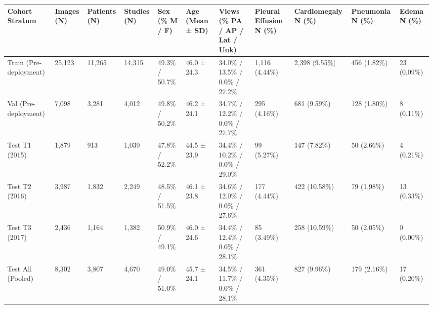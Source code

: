 \begin{tabular}{lllllllllll}
\toprule
Cohort Stratum & Images (N) & Patients (N) & Studies (N) & Sex (\% M / F) & Age (Mean ± SD) & Views (\% PA / AP / Lat / Unk) & Pleural Effusion N (\%) & Cardiomegaly N (\%) & Pneumonia N (\%) & Edema N (\%) \\
\midrule
Train (Pre-deployment) & 25,123 & 11,265 & 14,315 & 49.3\% / 50.7\% & 46.0 ± 24.3 & 34.0\% / 13.5\% / 0.0\% / 27.2\% & 1,116 (4.44\%) & 2,398 (9.55\%) & 456 (1.82\%) & 23 (0.09\%) \\
Val (Pre-deployment) & 7,098 & 3,281 & 4,012 & 49.8\% / 50.2\% & 46.2 ± 24.1 & 34.7\% / 12.2\% / 0.0\% / 27.7\% & 295 (4.16\%) & 681 (9.59\%) & 128 (1.80\%) & 8 (0.11\%) \\
Test T1 (2015) & 1,879 & 913 & 1,039 & 47.8\% / 52.2\% & 44.5 ± 23.9 & 34.4\% / 10.2\% / 0.0\% / 29.0\% & 99 (5.27\%) & 147 (7.82\%) & 50 (2.66\%) & 4 (0.21\%) \\
Test T2 (2016) & 3,987 & 1,832 & 2,249 & 48.5\% / 51.5\% & 46.1 ± 23.8 & 34.6\% / 12.0\% / 0.0\% / 27.6\% & 177 (4.44\%) & 422 (10.58\%) & 79 (1.98\%) & 13 (0.33\%) \\
Test T3 (2017) & 2,436 & 1,164 & 1,382 & 50.9\% / 49.1\% & 46.0 ± 24.6 & 34.4\% / 12.4\% / 0.0\% / 28.1\% & 85 (3.49\%) & 258 (10.59\%) & 50 (2.05\%) & 0 (0.00\%) \\
Test All (Pooled) & 8,302 & 3,807 & 4,670 & 49.0\% / 51.0\% & 45.7 ± 24.1 & 34.5\% / 11.7\% / 0.0\% / 28.1\% & 361 (4.35\%) & 827 (9.96\%) & 179 (2.16\%) & 17 (0.20\%) \\
\bottomrule
\end{tabular}
